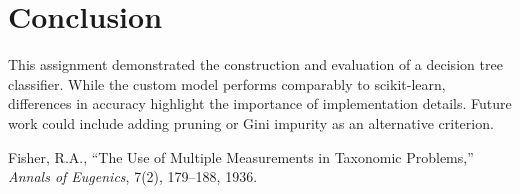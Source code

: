 \documentclass[a4paper,12pt]{article}
\begin{document}
\section{Conclusion}
This assignment demonstrated the construction and evaluation of a decision tree classifier. While the custom model performs comparably to scikit-learn, differences in accuracy highlight the importance of implementation details. Future work could include adding pruning or Gini impurity as an alternative criterion.

\begin{thebibliography}{9}
Fisher, R.A.,
``The Use of Multiple Measurements in Taxonomic Problems,''
\textit{Annals of Eugenics}, 7(2), 179--188, 1936.
\end{thebibliography}
\end{document}
